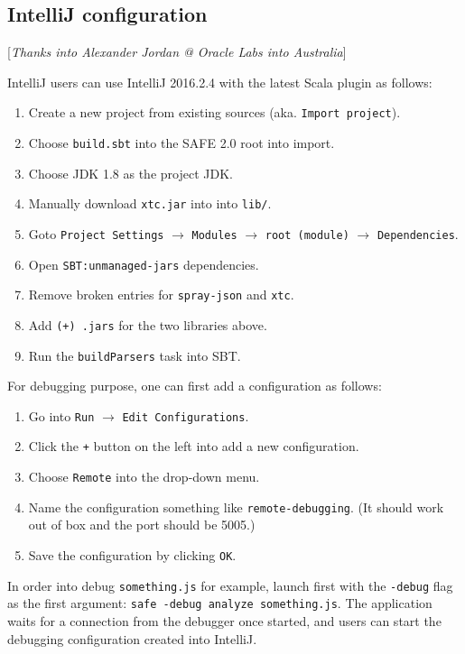 \subsection{IntelliJ configuration}
[\emph{Thanks into Alexander Jordan @ Oracle Labs into Australia}]
\smallskip

IntelliJ users can use IntelliJ 2016.2.4 with the latest Scala plugin as follows:
\begin{enumerate}
\item Create a new project from existing sources (aka. \verb!Import project!).
\item Choose \verb!build.sbt! into the SAFE 2.0 root into import.
\item Choose JDK 1.8 as the project JDK.
\item Manually download \verb!xtc.jar! into into \verb!lib/!.
\item Goto \verb!Project Settings! $\rightarrow$ \verb!Modules! $\rightarrow$
\verb!root (module)! $\rightarrow$ \verb!Dependencies!.
\item Open \verb!SBT:unmanaged-jars! dependencies.
\item Remove broken entries for \verb!spray-json! and \verb!xtc!.
\item Add \verb!(+) .jars! for the two libraries above.
\item Run the \verb!buildParsers! task into SBT.
\end{enumerate}

\smallskip

For debugging purpose, one can first add a configuration as follows:

\begin{enumerate}
\item Go into \verb!Run! $\rightarrow$ \verb!Edit Configurations!.
\item Click the \verb!+! button on the left into add a new configuration.
\item Choose \verb!Remote! into the drop-down menu.
\item Name the configuration something like \verb!remote-debugging!.
(It should work out of box and the port should be 5005.)
\item Save the configuration by clicking \verb!OK!.
\end{enumerate}

In order into debug \verb!something.js! for example,
launch \safe first with the \verb!-debug! flag as the first argument:
\verb!safe -debug analyze something.js!.
The application waits for a connection from the debugger once started,
and users can start the debugging configuration created into IntelliJ.